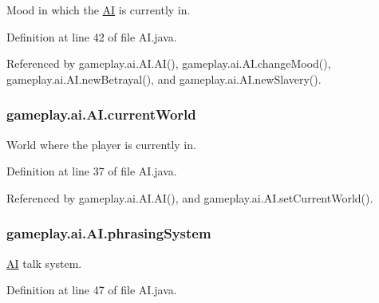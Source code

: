 Mood in which the \hyperlink{classgameplay_1_1ai_1_1_a_i}{A\-I} is currently in. 



Definition at line 42 of file A\-I.\-java.



Referenced by gameplay.\-ai.\-A\-I.\-A\-I(), gameplay.\-ai.\-A\-I.\-change\-Mood(), gameplay.\-ai.\-A\-I.\-new\-Betrayal(), and gameplay.\-ai.\-A\-I.\-new\-Slavery().

\hypertarget{classgameplay_1_1ai_1_1_a_i_ae4344290e04c468cdd631fc367f4f885}{
\subsubsection[{current\-World}]{ gameplay.\-ai.\-A\-I.\-current\-World\hspace{0.3cm}{\ttfamily [protected]}}}\label{classgameplay_1_1ai_1_1_a_i_ae4344290e04c468cdd631fc367f4f885}


World where the player is currently in. 



Definition at line 37 of file A\-I.\-java.



Referenced by gameplay.\-ai.\-A\-I.\-A\-I(), and gameplay.\-ai.\-A\-I.\-set\-Current\-World().

\hypertarget{classgameplay_1_1ai_1_1_a_i_ae868fc7b0dc6cab4bebd1d97712a6e7e}{
\subsubsection[{phrasing\-System}]{ gameplay.\-ai.\-A\-I.\-phrasing\-System\hspace{0.3cm}{\ttfamily [protected]}}}\label{classgameplay_1_1ai_1_1_a_i_ae868fc7b0dc6cab4bebd1d97712a6e7e}


\hyperlink{classgameplay_1_1ai_1_1_a_i}{A\-I} talk system. 



Definition at line 47 of file A\-I.\-java.



